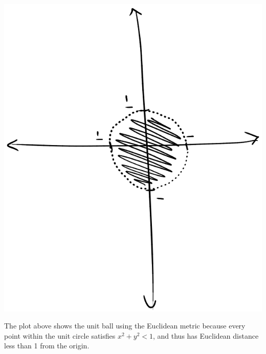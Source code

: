 \documentclass[12pt]{report}
\begin{document}
\begin{center} \includegraphics[angle=90,scale=.4]{circle.png} \end{center}
	The plot above shows the unit ball using the Euclidean metric because every point within the unit circle satisfies $x^2 + y^2 < 1$, and thus has Euclidean distance less than 1 from the origin.

\newpage 
\end{document}
